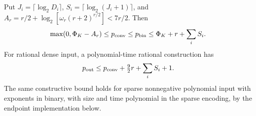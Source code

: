 \begin{theorem}\label{thm:positive-loglog}
Put $J_i=\lceil\log_2D_i\rceil$,
$S_i=\lceil\log_2(J_i+1)\rceil$, and
$A_r=r/2+\log_2[\omega_r(r+2)^{r/2}]<7r/2$. Then
\begin{equation}\label{eq:positive-loglog-law}
 \max(0,\Phi_K-A_r)\le p_{\mathrm{conv}}\le p_{\mathrm{bin}}
 \le\Phi_K+r+\sum_iS_i.
\end{equation}
For rational dense input, a polynomial-time rational construction has
\begin{equation}\label{eq:positive-loglog-count}
 p_{\mathrm{out}}\le p_{\mathrm{conv}}+\tfrac92r+\sum_iS_i+1.
\end{equation}
The same constructive bound holds for sparse nonnegative polynomial
input with exponents in binary, with size and time polynomial in the
sparse encoding, by the endpoint implementation below.
\end{theorem}
